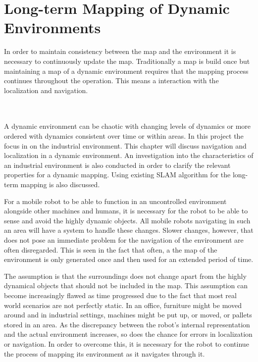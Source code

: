 \chapter{Long-term Mapping of Dynamic Environments}
\label{long_term_mapping}

In order to maintain consistency between the map and the environment it is necessary to continuously update the map. Traditionally a map is build once but maintaining a map of a dynamic environment requires that the mapping process continues throughout the operation. This means a interaction with the localization and navigation. 

\\\\
A dynamic environment can be chaotic with changing levels of dynamics or more ordered with dynamics consistent over time or within areas. In this project the focus in on the industrial environment.
This chapter will discuss navigation and localization in a dynamic environment. An investigation into the characteristics of an industrial environment is also conducted in order to clarify the relevant properties for a dynamic mapping. Using existing SLAM algorithm for the long-term mapping is also discussed. 


For a mobile robot to be able to function in an uncontrolled environment alongside other machines and humans, it is necessary for the robot to be able to sense and avoid the highly dynamic objects. All mobile robots navigating in such an area will have a system to handle these changes. Slower changes, however, that does not pose an immediate problem for the navigation of the environment are often disregarded. This is seen in the fact that often, a the map of the environment is only generated once and then used for an extended period of time. 

The assumption is that the surroundings does not change apart from the highly dynamical objects that should not be included in the map. This assumption can become increasingly flawed as time progressed due to the fact that most real world scenarios are not perfectly static. In an office, furniture might be moved around and in industrial settings, machines might be put up, or moved, or pallets stored in an area. As the discrepancy between the robot's internal representation and the actual environment increases, so does the chance for errors in localization or navigation. In order to overcome this, it is necessary for the robot to continue the process of mapping its environment as it navigates through it.







